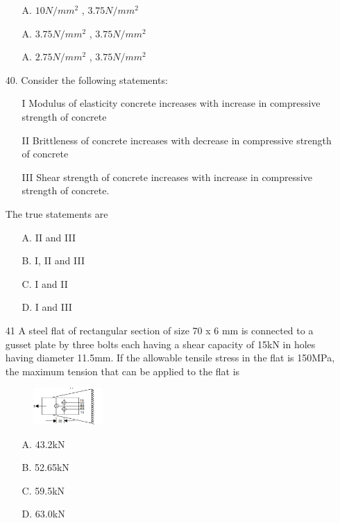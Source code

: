 \documentclass[journal]{IEEEtran}
\begin{document}
\begin{enumerate}
\begin{enumerate}
    \item [A.] $10N/mm^2$ , $3.75N/mm^2$
    \item [A.] $3.75N/mm^2$ , $3.75N/mm^2$ 
    \item [A.] $2.75N/mm^2$ , $3.75N/mm^2$ 
  \end{enumerate}
  \item[40.] Consider the following statements: 
  \begin{enumerate}
    \item [I] Modulus of elasticity concrete increases with increase in compressive
    strength of concrete
    \item [II] Brittleness of concrete increases with decrease in compressive strength of
    concrete
    \item [III] Shear strength of concrete increases with increase in compressive strength
    of concrete. 
  \end{enumerate}
  The true statements are 
  \begin{enumerate}
    \item [A.] II and III
    \item [B.] I, II and III
    \item [C.] I and II
    \item [D.] I and III
  \end{enumerate}
  \item[41]  A steel flat of rectangular section of size 70 x 6 mm is connected to a gusset plate
  by three bolts each having a shear capacity of 15kN in holes having diameter
  11.5mm. If the allowable tensile stress in the flat is 150MPa, the maximum
  tension that can be applied to the flat is
  \begin{figure}[h!]
    \centering
    \includegraphics[width=0.25\textwidth]{figs/Fig_3.png}  %
    \label{fig:sample3}
\end{figure}
  \begin{enumerate}
    \item [A.] 43.2kN
    \item [B.] 52.65kN
    \item [C.] 59.5kN
    \item [D.] 63.0kN
  \end{enumerate}

\end{enumerate}
\end{document}
